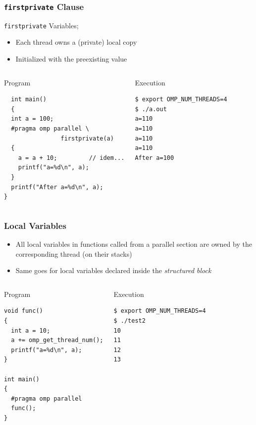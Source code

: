 \documentclass{beamer}
\begin{document}
\begin{frame}[fragile=singleslide]
  \frametitle{\texttt{firstprivate} Clause}
  
   \texttt{firstprivate} Variables;
  \begin{itemize}
  \item Each thread owns a (private) local copy
  \item Initialized with the preexisting value
  \end{itemize}
  
  \begin{columns}[t]
  \column{5cm}
\begin{block}{Program}
\begin{verbatim}
  int main()
  {
  int a = 100;
  #pragma omp parallel \
                firstprivate(a)
  {
    a = a + 10;         // idem...
    printf("a=%d\n", a);
  }
  printf("After a=%d\n", a);
}
\end{verbatim}
\end{block}
    
    
    \column{5cm}
\begin{block}{Execution}    
  \small
\begin{verbatim}
$ export OMP_NUM_THREADS=4
$ ./a.out 
a=110
a=110
a=110
a=110
After a=100
\end{verbatim}
\end{block}    
  \end{columns}
\end{frame}


\begin{frame}[fragile=singleslide]
  \frametitle{Local Variables}

  \begin{itemize}
  \item All local variables in functions called from a parallel section are
        owned by the corresponding thread (on their stacks)

  \item Same goes for local variables declared inside the \textit{structured block}
  \end{itemize}

\small
\begin{columns}[t]
  \column[T]{5cm}
\begin{block}{Program}
\begin{verbatim}
void func()
{
  int a = 10;
  a += omp_get_thread_num();
  printf("a=%d\n", a);
}

int main()
{
  #pragma omp parallel 
  func();
}
\end{verbatim}
\end{block}

\column[T]{5cm}
\begin{block}{Execution}
\begin{verbatim}
$ export OMP_NUM_THREADS=4
$ ./test2
10
11
12
13
\end{verbatim}
\end{block}
\end{columns}
\end{frame}
\end{document}
